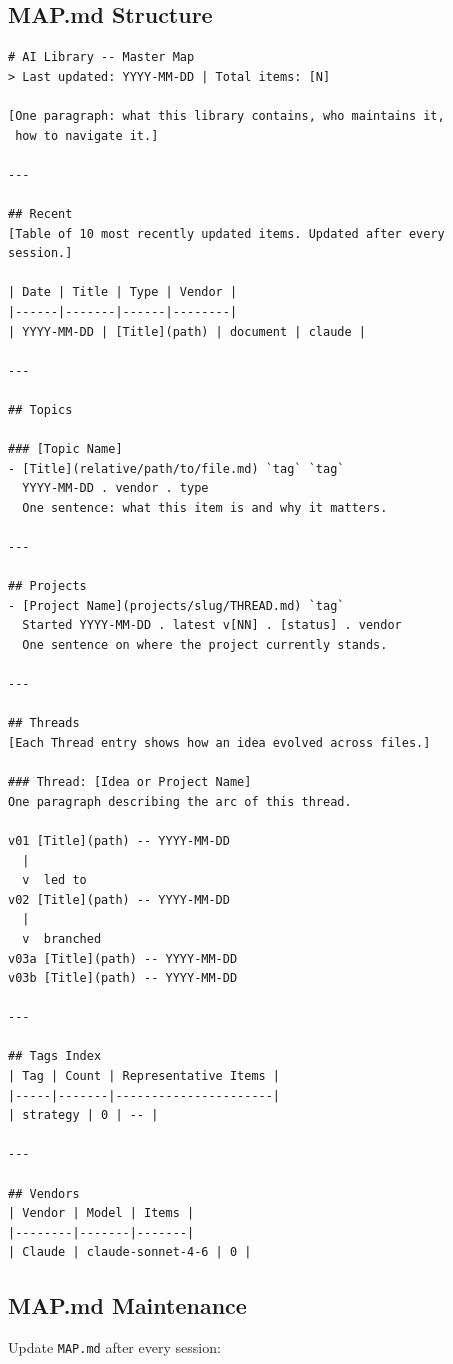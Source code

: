 \documentclass[12pt,letterpaper]{article}
\begin{document}
\subsection{MAP.md Structure}

\begin{lstlisting}
# AI Library -- Master Map
> Last updated: YYYY-MM-DD | Total items: [N]

[One paragraph: what this library contains, who maintains it, 
 how to navigate it.]

---

## Recent
[Table of 10 most recently updated items. Updated after every session.]

| Date | Title | Type | Vendor |
|------|-------|------|--------|
| YYYY-MM-DD | [Title](path) | document | claude |

---

## Topics

### [Topic Name]
- [Title](relative/path/to/file.md) `tag` `tag`
  YYYY-MM-DD . vendor . type
  One sentence: what this item is and why it matters.

---

## Projects
- [Project Name](projects/slug/THREAD.md) `tag`
  Started YYYY-MM-DD . latest v[NN] . [status] . vendor
  One sentence on where the project currently stands.

---

## Threads
[Each Thread entry shows how an idea evolved across files.]

### Thread: [Idea or Project Name]
One paragraph describing the arc of this thread.

v01 [Title](path) -- YYYY-MM-DD
  |
  v  led to
v02 [Title](path) -- YYYY-MM-DD
  |
  v  branched
v03a [Title](path) -- YYYY-MM-DD
v03b [Title](path) -- YYYY-MM-DD

---

## Tags Index
| Tag | Count | Representative Items |
|-----|-------|----------------------|
| strategy | 0 | -- |

---

## Vendors
| Vendor | Model | Items |
|--------|-------|-------|
| Claude | claude-sonnet-4-6 | 0 |
\end{lstlisting}

\subsection{MAP.md Maintenance}

Update \texttt{MAP.md} after every session:
\end{document}
